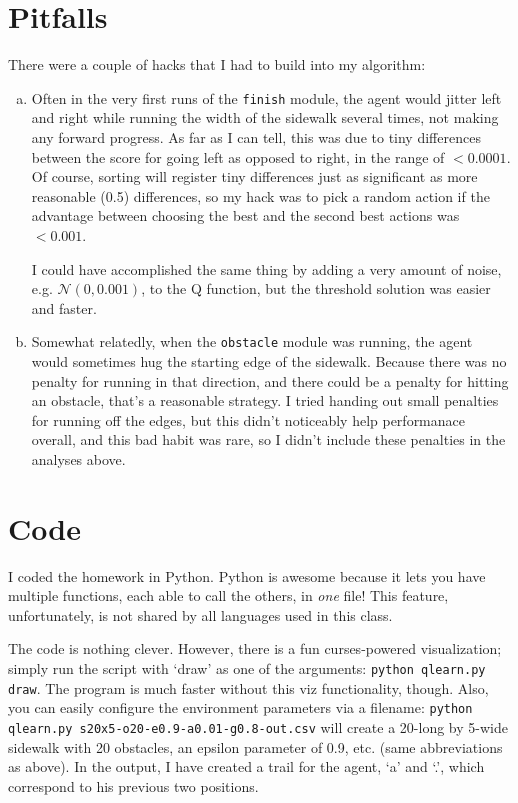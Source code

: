 \documentclass[11pt]{report}
\begin{document}
\section{Pitfalls}

There were a couple of hacks that I had to build into my algorithm:
\begin{enumerate}[a.]
  \item Often in the very first runs of the \texttt{finish} module, the agent would jitter left and right while running the width of the sidewalk several times, not making any forward progress. As far as I can tell, this was due to tiny differences between the score for going left as opposed to right, in the range of $< 0.0001$. Of course, sorting will register tiny differences just as significant as more reasonable (0.5) differences, so my hack was to pick a random action if the advantage between choosing the best and the second best actions was $< 0.001$.

  I could have accomplished the same thing by adding a very amount of noise, e.g. $\mathcal{N}(0, 0.001)$, to the Q function, but the threshold solution was easier and faster.

  \item Somewhat relatedly, when the \texttt{obstacle} module was running, the agent would sometimes hug the starting edge of the sidewalk. Because there was no penalty for running in that direction, and there could be a penalty for hitting an obstacle, that's a reasonable strategy. I tried handing out small penalties for running off the edges, but this didn't noticeably help performanace overall, and this bad habit was rare, so I didn't include these penalties in the analyses above.
\end{enumerate}

\section{Code}

I coded the homework in Python. Python is awesome because it lets you have multiple functions, each able to call the others, in \emph{one} file! This feature, unfortunately, is not shared by all languages used in this class.

The code is nothing clever. However, there is a fun curses-powered visualization; simply run the script with `draw' as one of the arguments: \texttt{python qlearn.py draw}. The program is much faster without this viz functionality, though. Also, you can easily configure the environment parameters via a filename: \texttt{python qlearn.py s20x5-o20-e0.9-a0.01-g0.8-out.csv} will create a 20-long by 5-wide sidewalk with 20 obstacles, an epsilon parameter of 0.9, etc. (same abbreviations as above).
In the output, I have created a trail for the agent, `a' and `.', which correspond to his previous two positions.
\end{document}

